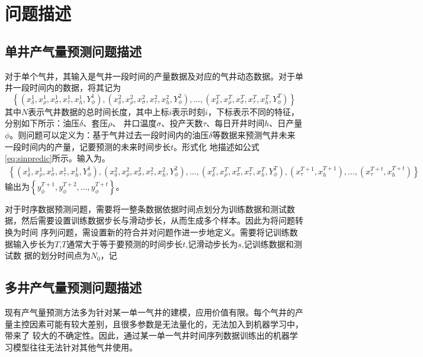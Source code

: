 \section{问题描述}
\subsection{单井产气量预测问题描述}
对于单个气井，其输入是气井一段时间的产量数据及对应的气井动态数据。对于单井一段时间内的数据，将其记为
\begin{equation}
    \left\{\left(x^1_{\delta}, x^1_{\rho}, x^1_{\sigma}, x^1_{\tau}, x^1_{h}, Y^1_{\phi}\right), \left(x^2_{\delta}, 
    x^2_{\rho}, x^2_{\sigma}, x^2_{\tau}, x^{2}_{h}, Y^2_{\phi}\right), \ldots, \left(x^T_{\delta}, x^T_{\rho}, x^T_{\sigma}, 
    x^T_{\tau}, x^{T}_{h}, Y^T_{\phi}\right)\right\}
    \label{eq:singlewell}
\end{equation}
其中\( N \)表示气井数据的总时间长度，其中上标$i$表示时刻$i$，下标表示不同的特征，分别如下所示：油压\( \delta \)、套压\( \rho \)、
井口温度\( \sigma \)、投产天数\( \tau \)、每日开井时间$h$、日产量$\phi$。则问题可以定义为：基于气井过去一段时间内的油压\( \delta \)等数据来预测气井未来一段时间内的产量，记要预测的未来时间步长$t$。形式化
地描述如公式\eqref{eq:sinpredic}所示。输入为。
\begin{equation}
    \begin{aligned}
        \left\{\left(x^1_{\delta}, x^1_{\rho}, x^1_{\sigma}, x^1_{\tau}, x^1_{h}, Y^1_{\phi}\right), \left(x^2_{\delta}, 
        x^2_{\rho}, x^2_{\sigma}, x^2_{\tau}, x^{2}_{h}, Y^2_{\phi}\right), \ldots, \left(x^T_{\delta}, x^T_{\rho}, x^T_{\sigma}, 
        x^T_{\tau}, x^{T}_{h}, Y^T_{\phi}\right), \left(x^{T+1}_{\tau}, x^{T+1}_{h}\right),\ldots, \left(x^{T+t}_{\tau}, 
        x^{T+t}_{h}\right)\right\}
    \end{aligned}
    \label{eq:sinpredic}
\end{equation}
输出为$\left\{ y^{T+1}_{\phi}, y^{T+2}_{\phi}, \ldots, y^{T+t}_{\phi} \right\}$。

对于时序数据预测问题，需要将一整条数据依据时间点划分为训练数据和测试数据，然后需要设置训练数据步长与滑动步长，从而生成多个样本。因此为将问题转换为时间
序列问题，需设置新的符合并对问题作进一步地定义。需要将记训练数据输入步长为$T$,$T$通常大于等于要预测的时间步长$t$,记滑动步长为$s$,记训练数据和测试数
据的划分时间点为$N_0$，记
\subsection{多井产气量预测问题描述}
现有产气量预测方法多为针对某一单一气井的建模，应用价值有限。每个气井的产量主控因素可能有较大差别，且很多参数是无法量化的，无法加入到机器学习中，带来了
较大的不确定性。因此，通过某一单一气井时间序列数据训练出的机器学习模型往往无法针对其他气井使用。

